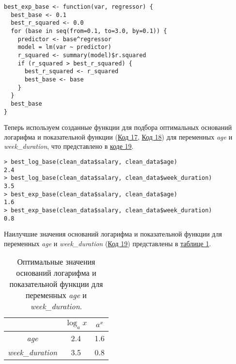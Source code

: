\begin{code}
\begin{verbatim}
best_exp_base <- function(var, regressor) {
  best_base <- 0.1
  best_r_squared <- 0.0
  for (base in seq(from=0.1, to=3.0, by=0.1)) {
    predictor <- base^regressor
    model = lm(var ~ predictor)
    r_squared <- summary(model)$r.squared
    if (r_squared > best_r_squared) {
      best_r_squared <- r_squared
      best_base <- base
    }
  }
  best_base
}
\end{verbatim}
\label{code:18}
\end{code}

Теперь используем созданные функции для подбора оптимальных оснований логарифма и показательной функции (\hyperref[code:17]{Код 17}, \hyperref[code:18]{Код 18}) для переменных \textit{age} и \textit{week\_duration}, что представлено в \hyperref[code:19]{коде 19}.

\begin{code}
\begin{verbatim}
> best_log_base(clean_data$salary, clean_data$age)
2.4
> best_log_base(clean_data$salary, clean_data$week_duration)
3.5
> best_exp_base(clean_data$salary, clean_data$age)
1.6
> best_exp_base(clean_data$salary, clean_data$week_duration)
0.8
\end{verbatim}
\label{code:19}
\end{code}

Наилучшие значения оснований логарифма и показательной функции для переменных \textit{age} и \textit{week\_duration} (\hyperref[code:20]{Код 19}) представлены в \hyperref[table:1]{таблице 1}.

\begin{table}[H]
    \caption{Оптимальные значения оснований логарифма и показательной функции для переменных \textit{age} и \textit{week\_duration}.}
    \centering
    \begin{tabular}{|c|c|c|}
        \hline & $\log_a x$ & $a^x$ \\
        \hline \textit{age} & 2.4 & 1.6 \\
        \hline \textit{week\_duration} & 3.5 & 0.8 \\
        \hline
    \end{tabular}
    \label{table:1}
\end{table}

